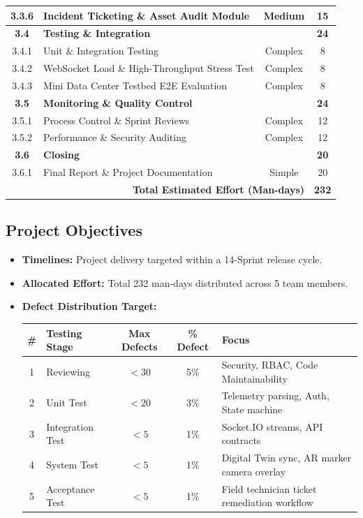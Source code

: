 \begin{table}[H]
\begin{tabular}{|c|l|c|c|}
        3.3.6 & Incident Ticketing \& Asset Audit Module & Medium & 15 \\ \hline
        \textbf{3.4} & \textbf{Testing \& Integration} & & \textbf{24} \\ \hline
        3.4.1 & Unit \& Integration Testing & Complex & 8 \\ \hline
        3.4.2 & WebSocket Load \& High-Throughput Stress Test & Complex & 8 \\ \hline
        3.4.3 & Mini Data Center Testbed E2E Evaluation & Complex & 8 \\ \hline
        \textbf{3.5} & \textbf{Monitoring \& Quality Control} & & \textbf{24} \\ \hline
        3.5.1 & Process Control \& Sprint Reviews & Complex & 12 \\ \hline
        3.5.2 & Performance \& Security Auditing & Complex & 12 \\ \hline
        \textbf{3.6} & \textbf{Closing} & & \textbf{20} \\ \hline
        3.6.1 & Final Report \& Project Documentation & Simple & 20 \\ \hline
        \multicolumn{3}{|r|}{\textbf{Total Estimated Effort (Man-days)}} & \textbf{232} \\ \hline
    \end{tabular}
\end{table}

\subsection{Project Objectives}
\begin{itemize}
    \item \textbf{Timelines:} Project delivery targeted within a 14-Sprint release cycle.
    \item \textbf{Allocated Effort:} Total 232 man-days distributed across 5 team members.
    \item \textbf{Defect Distribution Target:}
    \begin{table}[H]
        \centering
        \begin{tabular}{|c|l|c|c|p{5cm}|}
            \hline
            \textbf{\#} & \textbf{Testing Stage} & \textbf{Max Defects} & \textbf{\% Defect} & \textbf{Focus} \\ \hline
            1 & Reviewing & $<30$ & 5\% & Security, RBAC, Code Maintainability \\ \hline
            2 & Unit Test & $<20$ & 3\% & Telemetry parsing, Auth, State machine \\ \hline
            3 & Integration Test & $<5$ & 1\% & Socket.IO streams, API contracts \\ \hline
            4 & System Test & $<5$ & 1\% & Digital Twin sync, AR marker camera overlay \\ \hline
            5 & Acceptance Test & $<5$ & 1\% & Field technician ticket remediation workflow \\ \hline
        \end{tabular}
    \end{table}
\end{itemize}

